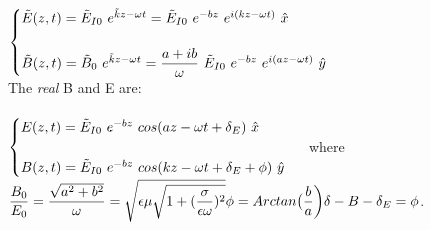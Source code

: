 \documentclass[fleqn]{article}
\begin{document}
\begin{enumerate}
\begin{enumerate}
      \textcolor{hwColor}{
        \\
        $
          \begin{cases}
            \tilde{E}(z,t)=\tilde{E}_{I0} ~ e^{\tilde{k}z-\omega t}
            =\tilde{E}_{I0} ~ e^{-bz} ~ e^{i(kz-\omega t)} ~ \hat{x}
            \\
            \\
            \tilde{B}(z,t)=\tilde{B}_0 ~ e^{\tilde{k}z-\omega t}
            =\dfrac{a+ib}{\omega} ~ \tilde{E}_{I0} ~ e^{-bz} ~ e^{i(az-\omega t)} ~ \hat{y}
          \end{cases}
          \\
          \\
        $
        \\
        The \emph{real} B and E are:
        \\
        \\
        $
          \begin{cases}
            E(z,t)=\tilde{E}_{I0} ~ e^{-bz} ~ cos(az-\omega t+\delta_E) ~ \hat{x}
            \\
            \\
            B(z,t)=\tilde{E}_{I0} ~ e^{-bz} ~ cos(kz-\omega t+\delta_E+\phi) ~ \hat{y}
          \end{cases}
          \\
          \\
          \\
        $
        where 
        $
          \\
          \\
          \dfrac{B_0}{E_0}=\dfrac{\sqrt{a^2+b^2}}{\omega}=\sqrt{\epsilon \mu \sqrt{1+(\dfrac{\sigma}{\epsilon \omega})^2}}
          \\
          \\
          \\
          \phi=Arctan\big( \dfrac{b}{a} \bigg)
          \\
          \\
          \\
          \delta-B-\delta_E=\phi
          \\
          \\
        $.
      }

    \end{enumerate}

  \end{enumerate}
\end{document}
